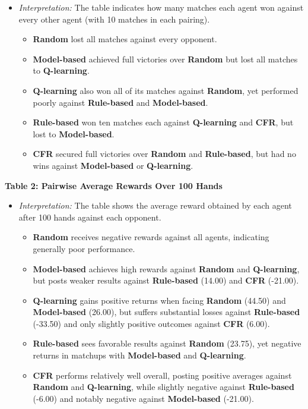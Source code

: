 \documentclass{article}
\begin{document}
\begin{itemize}
    \item \textit{Interpretation:} The table indicates how many matches each agent won against every other agent (with 10 matches in each pairing).
    \begin{itemize}
        \item \textbf{Random} lost all matches against every opponent.
        \item \textbf{Model-based} achieved full victories over \textbf{Random} but lost all matches to \textbf{Q-learning}.
        \item \textbf{Q-learning} also won all of its matches against \textbf{Random}, yet performed poorly against \textbf{Rule-based} and \textbf{Model-based}.
        \item \textbf{Rule-based} won ten matches each against \textbf{Q-learning} and \textbf{CFR}, but lost to \textbf{Model-based}.
        \item \textbf{CFR} secured full victories over \textbf{Random} and \textbf{Rule-based}, but had no wins against \textbf{Model-based} or \textbf{Q-learning}.
    \end{itemize}
\end{itemize}

\textbf{Table 2: Pairwise Average Rewards Over 100 Hands}

\begin{itemize}
    \item \textit{Interpretation:} The table shows the average reward obtained by each agent after 100 hands against each opponent.
    \begin{itemize}
        \item \textbf{Random} receives negative rewards against all agents, indicating generally poor performance.
        \item \textbf{Model-based} achieves high rewards against \textbf{Random} and \textbf{Q-learning}, but posts weaker results against \textbf{Rule-based} (14.00) and \textbf{CFR} (-21.00).
        \item \textbf{Q-learning} gains positive returns when facing \textbf{Random} (44.50) and \textbf{Model-based} (26.00), but suffers substantial losses against \textbf{Rule-based} (-33.50) and only slightly positive outcomes against \textbf{CFR} (6.00).
        \item \textbf{Rule-based} sees favorable results against \textbf{Random} (23.75), yet negative returns in matchups with \textbf{Model-based} and \textbf{Q-learning}.
        \item \textbf{CFR} performs relatively well overall, posting positive averages against \textbf{Random} and \textbf{Q-learning}, while slightly negative against \textbf{Rule-based} (-6.00) and notably negative against \textbf{Model-based} (-21.00).
    \end{itemize}
\end{itemize}
\end{document}
